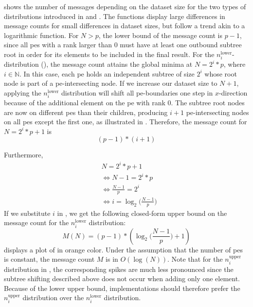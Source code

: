  shows the number of messages depending on the dataset size for the two types of distributions introduced in  and .
The functions display large differences in message counts for small differences in dataset sizes, but follow a trend akin to a logarithmic function.
For $N > p$, the lower bound of the message count is $p - 1$, since all \glspl{pe} with a rank larger than $0$ must have at least one outbound subtree root in order for its elements to be included in the final result.
For the $n_i^\textrm{lower}$-distribution (), the message count attains the global minima at $N = 2^i * p$, where $i \in \mathbb{N}$.
In this case, each \gls{pe} holds an independent subtree of size $2^i$ whose root node is part of a \gls{pe}-intersecting node.
If we increase our dataset size to $N+1$, applying the $n_i^\textrm{lower}$ distribution will shift all \gls{pe}-boundaries one step in $x$-direction because of the additional element on the \gls{pe} with rank $0$.
The subtree root nodes are now on different \glspl{pe} than their children, producing $i + 1$ \gls{pe}-intersecting nodes on all \glspl{pe} except the first one, as illustrated in .
Therefore, the message count for $N = 2^i * p + 1$ is 
\begin{equation}
\label{eq:messageCountI}
(p - 1) * (i + 1)
\end{equation}

Furthermore,
\begin{align*}
&N = 2^i * p + 1 \\ 
&\Leftrightarrow N - 1 = 2^i * p \\
&\Leftrightarrow \frac{N - 1}{p} = 2^i \\
&\Leftrightarrow i = \log_2 \big(\frac{N - 1}{p}\big)
\end{align*}
If we substitute $i$ in , we get the following closed-form upper bound on the message count for the $n_i^\textrm{lower}$ distribution:
\begin{equation}
\label{eq:upperBoundLowerDistribution}
M(N) = (p - 1) * (\log_2 \Big( \frac{N - 1}{p} \Big) + 1)
\end{equation}
 displays a plot of   in orange color.
Under the assumption that the number of \glspl{pe} is constant, the message count $M$ is in $O(\log(N))$.
Note that for the $n_i^\textrm{upper}$ distribution in , the corresponding spikes are much less pronounced since the subtree shifting described above does not occur when adding only one element.
Because of the lower upper bound, implementations should therefore prefer the $n_i^\textrm{upper}$ distribution over the $n_i^\textrm{lower}$ distribution.

